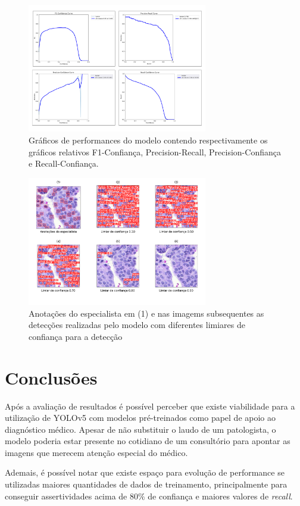\documentclass[12pt]{article}
\begin{document}
\begin{figure}[ht]
  \centering
  \includegraphics[width=0.7\textwidth]{images/graph_results.png}
  \caption{Gráficos de performances do modelo contendo respectivamente os gráficos relativos F1-Confiança, Precision-Recall, Precision-Confiança e Recall-Confiança.}
  \label{fig:graph}
\end{figure}

\begin{figure}[ht]
  \centering
  \includegraphics[width=0.7\textwidth]{images/confidence_threshold.png}
  \caption{Anotações do especialista em (1) e nas imagems subsequentes as detecções realizadas pelo modelo com diferentes limiares de confiança para a detecção}
  \label{fig:confidence_threshold}
\end{figure}

\FloatBarrier

\section{Conclusões}

Após a avaliação de resultados é possível perceber que existe viabilidade para a utilização de YOLOv5 com modelos pré-treinados como papel de apoio ao diagnóstico médico. Apesar de não substituir o laudo de um patologista, o modelo poderia estar presente no cotidiano de um consultório para apontar as imagens que merecem atenção especial do médico.

Ademais, é possível notar que existe espaço para evolução de performance se utilizadas maiores quantidades de dados de treinamento, principalmente para conseguir assertividades acima de $80\%$ de confiança e maiores valores de {\it recall}.



\end{document}
